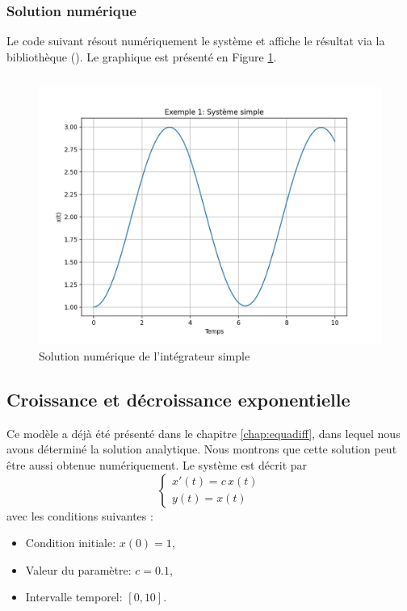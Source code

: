             \subsubsection{Solution numérique}
                Le code suivant résout numériquement le système et affiche le résultat via la bibliothèque  (\cite{Matplotlib2007}). Le graphique est présenté en Figure \ref{fig:integrateur_simple}. 
                \inputminted{python}{codes/integrateur_simple.py}
                \begin{figure}[ht!]
                    \centering
                    \includegraphics[width=\textwidth]{images/integrateur_simple.jpg}
                    \caption{Solution numérique de l'intégrateur simple}
                    \label{fig:integrateur_simple}
                \end{figure}

        \subsection{Croissance et décroissance exponentielle}
            Ce modèle a déjà été présenté dans le chapitre \ref{chap:equadiff}, dans lequel nous avons déterminé la solution analytique. Nous montrons que cette solution peut être aussi obtenue numériquement. Le système est décrit par
            \begin{equation*}
            \begin{cases}
            x'(t)=c\,x(t)\\
            y(t)=x(t)
            \end{cases}
            \end{equation*}
            avec les conditions suivantes :
            \begin{itemize}
                \item Condition initiale: $x(0)=1$,
                \item Valeur du paramètre: $c=0.1$,
                \item Intervalle temporel: $[0,10]$.
            \end{itemize}
        
